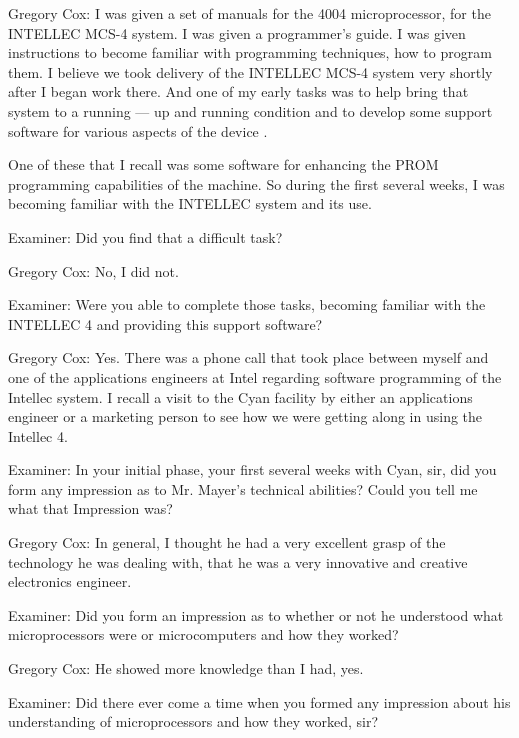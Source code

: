 \textcolor{interviewee}{Gregory Cox:} I was given a set of manuals for the 4004 microprocessor, for the INTELLEC MCS-4 system. I was given a programmer's guide. I was given instructions to become familiar with programming techniques, how to program them. I believe we took delivery of the INTELLEC MCS-4 system very shortly after I began work there. And one of my early tasks was to help bring that system to a running — up and running condition and to develop some support software for various aspects of the device . 

One of these that I recall was some software for enhancing the PROM programming capabilities of the machine. So during the first several weeks, I was becoming familiar with the INTELLEC system and its use. 

\textcolor{interviewer}{Examiner:} Did you find that a difficult task? 

\textcolor{interviewee}{Gregory Cox:} No, I did not. 

\textcolor{interviewer}{Examiner:} Were you able to complete those tasks, becoming familiar with the INTELLEC 4 and providing this support software? 

\textcolor{interviewee}{Gregory Cox:} Yes. There was a phone call that took place between myself and one of the applications engineers at Intel regarding software programming of the Intellec system. I recall a visit to the Cyan facility by either an applications engineer or a marketing person to see how we were getting along in using the Intellec 4. 

\textcolor{interviewer}{Examiner:} In your initial phase, your first several weeks with Cyan, sir, did you form any impression as to Mr. Mayer's technical abilities? Could you tell me what that Impression was? 

\textcolor{interviewee}{Gregory Cox:} In general, I thought he had a very excellent grasp of the technology he was dealing with, that he was a very innovative and creative electronics engineer. 

\textcolor{interviewer}{Examiner:} Did you form an impression as to whether or not he understood what microprocessors were or microcomputers and how they worked? 

\textcolor{interviewee}{Gregory Cox:} He showed more knowledge than I had, yes. 

\textcolor{interviewer}{Examiner:} Did there ever come a time when you formed any impression about his understanding of microprocessors and how they worked, sir? 

